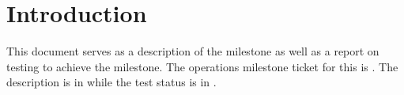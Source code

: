 
\section{Introduction}

This document serves as a description of the milestone {\it\milestone} as well as a report on testing to achieve the milestone.
The operations milestone ticket for this is  .
The description is in  while the test status is in .






